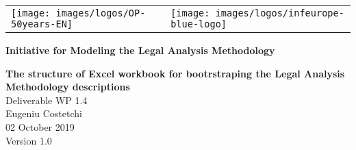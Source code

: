 
\newcommand{\DelTitle}{The structure of Excel workbook for bootrstraping the Legal Analysis Methodology descriptions}
\newcommand{\DelNumber}{WP 1.4}
\newcommand{\DelVersion}{1.0}
\newcommand{\DelAuthor}{Eugeniu Costetchi}
\newcommand{\DelDate}{02 October 2019}
\newcommand{\DelFilename}{wp1-4-excel-structure}


\pagestyle{empty}
\graphicspath{{figures/}}

\begin{titlepage}
\begin{center}

\begin{center}
  \begin{center}
    \setlength{\tabcolsep}{0pt}
    \begin{tabular}{>{\raggedleft}m{3.5cm}>{\centering}m{\dimexpr\textwidth - 8cm\relax}>{\raggedright}m{3.5cm}}
      \texttt{[image: images/logos/OP-50years-EN]}%
      &%
      &%
      \texttt{[image: images/logos/infeurope-blue-logo]} %
    \end{tabular}
  \end{center}


  \vspace{2mm}

  \end{center}
  \vspace{4cm}
  \textbf{{\large Initiative for Modeling the Legal Analysis Methodology\\}}
  \vspace{2cm}
  
  \begin{spacing}{2.5}
    \textbf{\Huge \DelTitle}\\ \vspace{2cm}
    {\large Deliverable \DelNumber} \\ %
  {\large \DelAuthor} \\ %
  {\large \DelDate} \\ %
    {\large Version \DelVersion}
  \end{spacing}
  
  \vspace*{\fill}


\end{center}
\end{titlepage}

